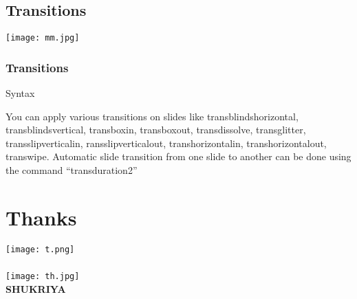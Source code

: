 \documentclass{beamer}
\begin{document}
            \subsection{Transitions}
            {\texttt{[image: mm.jpg]}}
                \begin{frame}
                \frametitle{Transitions}
                \transwipe
                    \begin{block}{Syntax}
                                
                    \end{block}
                    You can apply various transitions on slides like transblindshorizontal, transblindsvertical, transboxin, transboxout, transdissolve, transglitter, transslipverticalin, ransslipverticalout, transhorizontalin, transhorizontalout, transwipe. Automatic slide transition from one slide to another can be done using the command ``transduration{2}''
                \end{frame}


    \section{Thanks} 
                {\texttt{[image: t.png]}}
                \begin{frame}
                \frametitle{}
                    \texttt{[image: th.jpg]} \\
                    \color{yellow}\textbf{\textrm{\LARGE{SHUKRIYA}}}
                \end{frame}

    
\end{document}
